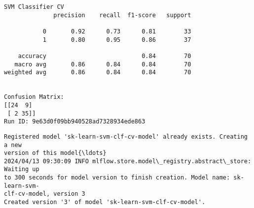 \documentclass[11pt]{article}
\begin{document}
    \begin{Verbatim}[commandchars=\\\{\}]
SVM Classifier CV
              precision    recall  f1-score   support

           0       0.92      0.73      0.81        33
           1       0.80      0.95      0.86        37

    accuracy                           0.84        70
   macro avg       0.86      0.84      0.84        70
weighted avg       0.86      0.84      0.84        70


Confusion Matrix:
[[24  9]
 [ 2 35]]
Run ID: 9e63d0f09bb940528ad7328934ede863
    \end{Verbatim}

    \begin{Verbatim}[commandchars=\\\{\}]
Registered model 'sk-learn-svm-clf-cv-model' already exists. Creating a new
version of this model{\ldots}
2024/04/13 09:30:09 INFO mlflow.store.model\_registry.abstract\_store: Waiting up
to 300 seconds for model version to finish creation. Model name: sk-learn-svm-
clf-cv-model, version 3
Created version '3' of model 'sk-learn-svm-clf-cv-model'.
    \end{Verbatim}
\end{document}
